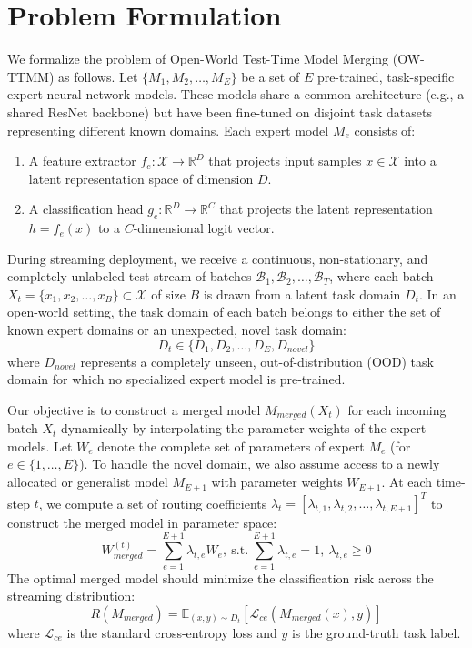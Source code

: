 \documentclass{article}
\theoremstyle{plain}
\theoremstyle{definition}
\theoremstyle{remark}
\begin{document}
\section{Problem Formulation}
\label{sec:problem}

We formalize the problem of Open-World Test-Time Model Merging (OW-TTMM) as follows. Let $\{M_1, M_2, \dots, M_E\}$ be a set of $E$ pre-trained, task-specific expert neural network models. These models share a common architecture (e.g., a shared ResNet backbone) but have been fine-tuned on disjoint task datasets representing different known domains. Each expert model $M_e$ consists of:
\begin{enumerate}\itemsep=0pt \parsep=0pt \vspace{-3pt}
    \item A feature extractor $f_e: \mathcal{X} \to \mathbb{R}^D$ that projects input samples $x \in \mathcal{X}$ into a latent representation space of dimension $D$.
    \item A classification head $g_e: \mathbb{R}^D \to \mathbb{R}^C$ that projects the latent representation $h = f_e(x)$ to a $C$-dimensional logit vector.
\end{enumerate}\vspace{-3pt}

During streaming deployment, we receive a continuous, non-stationary, and completely unlabeled test stream of batches $\mathcal{B}_1, \mathcal{B}_2, \dots, \mathcal{B}_T$, where each batch $X_t = \{x_1, x_2, \dots, x_B\} \subset \mathcal{X}$ of size $B$ is drawn from a latent task domain $D_t$. In an open-world setting, the task domain of each batch belongs to either the set of known expert domains or an unexpected, novel task domain:
\begin{equation}
D_t \in \{D_1, D_2, \dots, D_E, D_{novel}\}
\end{equation}
where $D_{novel}$ represents a completely unseen, out-of-distribution (OOD) task domain for which no specialized expert model is pre-trained.

Our objective is to construct a merged model $M_{merged}(X_t)$ for each incoming batch $X_t$ dynamically by interpolating the parameter weights of the expert models. Let $W_e$ denote the complete set of parameters of expert $M_e$ (for $e \in \{1, \dots, E\}$). To handle the novel domain, we also assume access to a newly allocated or generalist model $M_{E+1}$ with parameter weights $W_{E+1}$. At each time-step $t$, we compute a set of routing coefficients $\lambda_t = [\lambda_{t, 1}, \lambda_{t, 2}, \dots, \lambda_{t, E+1}]^T$ to construct the merged model in parameter space:
\begin{equation}
W_{merged}^{(t)} = \sum_{e=1}^{E+1} \lambda_{t, e} W_e, \ \text{s.t.} \ \sum_{e=1}^{E+1} \lambda_{t, e} = 1, \ \lambda_{t, e} \ge 0
\end{equation}
The optimal merged model should minimize the classification risk across the streaming distribution:
\begin{equation}
R(M_{merged}) = \mathbb{E}_{(x, y) \sim D_t} \left[ \mathcal{L}_{ce}(M_{merged}(x), y) \right]
\end{equation}
where $\mathcal{L}_{ce}$ is the standard cross-entropy loss and $y$ is the ground-truth task label.
\end{document}
